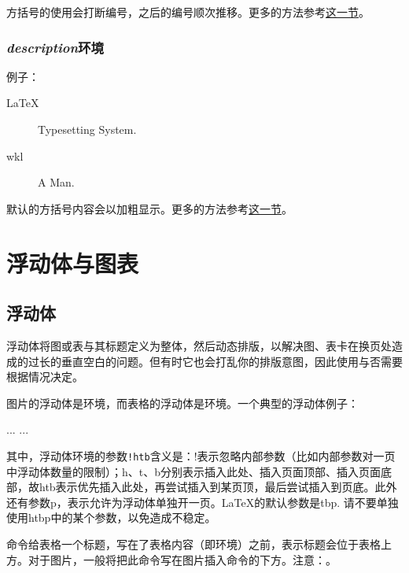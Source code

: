 方括号的使用会打断编号，之后的编号顺次推移。更多的方法参考\hyperref[sec:list]{这一节}。

\subsubsection{\textit{description}环境}
例子：

\begin{codeshow}
\begin{description}
  \item[LaTeX] Typesetting System.
  \item[wkl] A Man.
\end{description}
\end{codeshow}

默认的方括号内容会以加粗显示。更多的方法参考\hyperref[sec:list]{这一节}。

\section{浮动体与图表}
\label{sec:float}

\subsection{浮动体}
浮动体将图或表与其标题定义为整体，然后动态排版，以解决图、表卡在换页处造成的过长的垂直空白的问题。但有时它也会打乱你的排版意图，因此使用与否需要根据情况决定。

图片的浮动体是环境，而表格的浮动体是环境。一个典型的浮动体例子：
\begin{latex}
\begin{table}[!htb]
    \centering
    \caption{table-cap}
    \label{table-name}
    \begin{tabular}{...}
        ...
    \end{tabular}
\end{table}
\end{latex}

其中，浮动体环境的参数\verb|!htb|含义是：!表示忽略内部参数（比如内部参数对一页中浮动体数量的限制）；h、t、b分别表示插入此处、插入页面顶部、插入页面底部，故htb表示优先插入此处，再尝试插入到某页顶，最后尝试插入到页底。此外还有参数p，表示允许为浮动体单独开一页。\LaTeX 的默认参数是tbp. 请不要单独使用htbp中的某个参数，以免造成不稳定。

命令给表格一个标题，写在了表格内容（即环境）之前，表示标题会位于表格上方。对于图片，一般将把此命令写在图片插入命令的下方。注意：。\dpar

